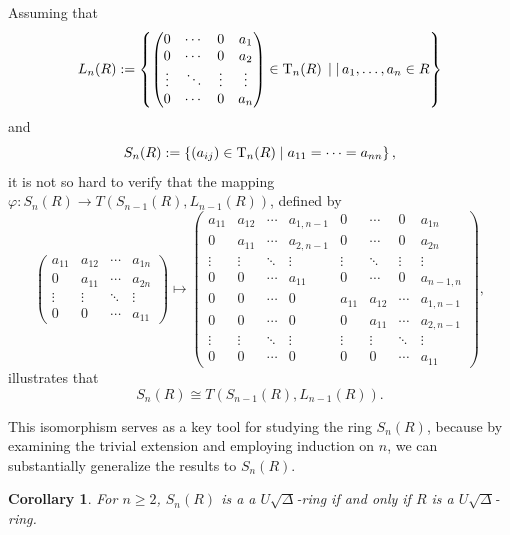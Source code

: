 \documentclass[11pt]{amsart}
\newtheorem{corollary}[theorem]{Corollary}
\theoremstyle{definition}
\begin{document}
Assuming that
$$
L_n(R) := \left\{
\begin{pmatrix}
	0 & \cdots & 0 & a_1 \\
	0 & \cdots & 0 & a_2 \\
	\vdots & \ddots & \vdots & \vdots \\
	0 & \cdots & 0 & a_n
\end{pmatrix}
\in {\rm T}_n(R) \,\mid|\, a_1,\dots,a_n \in R \right\}
$$
and
$$
S_n(R) := \left\{(a_{ij}) \in {\rm T}_n(R) \mid a_{11} = \cdots = a_{nn} \right\},
$$
it is not so hard to verify that the mapping $\varphi: S_n(R) \to T(S_{n-1}(R), L_{n-1}(R))$, defined by
$$
\begin{pmatrix}
	a_{11} & a_{12} & \cdots & a_{1n} \\
	0 & a_{11} & \cdots & a_{2n} \\
	\vdots & \vdots & \ddots & \vdots \\
	0 & 0 & \cdots & a_{11}
\end{pmatrix}
\mapsto
\begin{pmatrix}
	a_{11} & a_{12} & \cdots & a_{1,n-1} & 0 & \cdots & 0 & a_{1n} \\
	0 & a_{11} & \cdots & a_{2,n-1} & 0 & \cdots & 0 & a_{2n} \\
	\vdots & \vdots & \ddots & \vdots & \vdots & \ddots & \vdots & \vdots \\
	0 & 0 & \cdots & a_{11} & 0 & \cdots & 0 & a_{n-1,n} \\
	0 & 0 & \cdots & 0 & a_{11} & a_{12} & \cdots & a_{1,n-1} \\
	0 & 0 & \cdots & 0 & 0 & a_{11} & \cdots & a_{2,n-1} \\
	\vdots & \vdots & \ddots & \vdots & \vdots & \vdots & \ddots & \vdots \\
	0 & 0 & \cdots & 0 & 0 & 0 & \cdots & a_{11}
\end{pmatrix},$$
illustrates that $$S_n(R) \cong T(S_{n-1}(R), L_{n-1}(R)).$$

This isomorphism serves as a key tool for studying the ring $S_n(R)$, because by examining the trivial extension and employing induction on $n$, we can substantially generalize the results to $S_n(R)$.


\begin{corollary}
For $n \ge 2$, $S_n(R)$ is a a $U\sqrt{\Delta}$-ring if and only if $R$ is a $U\sqrt{\Delta}$-ring.
\end{corollary}
\end{document}
